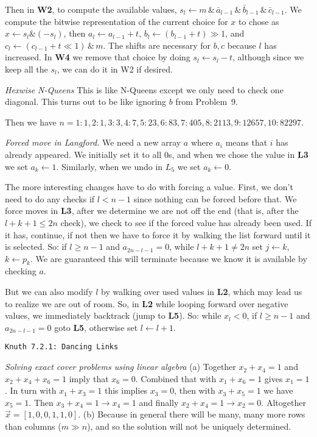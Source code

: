 Then in {\bf W2}, to compute the available values,
$s_l \leftarrow m \,\&\, {\bar a_{l-1}} \,\&\, {\bar b_{l-1}} \,\&\, 
{\bar c_{l-1}}$. We compute the bitwise representation of the current choice 
for $x$ to chose as $x \leftarrow s_l \& \left(- s_l\right)$, then 
$a_l \leftarrow a_{l-1} + t$, $b_l \leftarrow \left(b_{l-1} + t\right) \gg 1$, 
and  $c_l \leftarrow \left( {c_{l-1} + t} \ll 1 \right) \,\&\, m$.  The shifts 
are necessary for $b, c$ because $l$ has increased.  In {\bf W4} we
remove that choice by doing $s_l \leftarrow s_l - t$, although since we keep
all the $s_l$, we can do it in W2 if desired.

 {\it Hexwise N-Queens}\hfil\break
This is like N-Queens except we only need to check one diagonal.  This turns out
to be like ignoring $b$ from Problem~9.

Then we have $n=1: 1, 2: 1, 3: 3, 4: 7, 5: 23, 6: 83, 7: 405, 8: 2113, 9: 12657,
10: 82297$.

 {\it Forced move in Langford.}\hfil\break
We need a new array $a$ where $a_i$ means that $i$ has already appeared.
We initially set it to all 0s, and when we chose the value in {\bf L3}
we set $a_k \leftarrow 1$.  Similarly, when we undo in $L_5$ we set
$a_k \leftarrow 0$.

The more interesting changes have to do with forcing a value.  First,
we don't need to do any checks if $l < n - 1$ since nothing can be forced
before that.  We force moves in {\bf L3}, after we determine we are not
off the end (that is, after the $l + k + 1 \le 2 n$ check), we check to see 
if the forced value has already been used.  If it has, continue, if not
then we have to force it by walking the list forward until it is selected.
So: if $l \ge n - 1$ and $a_{2n - l - 1} = 0$, while $l + k + 1 \ne 2 n$
set $j \leftarrow k$, $k \leftarrow p_k$.  We are guaranteed this will
terminate because we know it is available by checking $a$.

But we can also modify $l$ by walking over used values in {\bf L2}, which
may lead us to realize we are out of room.  So, in {\bf L2} while looping
forward over negative values, we immediately backtrack (jump to {\bf L5}).
So: while $x_l < 0$, if $l \ge n - 1$ and $a_{2 n - l - 1} = 0$ goto {\bf L5},
otherwise set $l \leftarrow l + 1$.


\topglue 0.5in
\centerline{\tt Knuth 7.2.1: Dancing Links}
\vskip 0.3in

 {\it Solving exact cover problems using
linear algebra}\hfil\break
(a) Together $x_2 + x_4 = 1$ and $x_2 + x_4 + x_6 = 1$
imply that $x_6 = 0$.  Combined that with $x_1 + x_6 = 1$
gives $x_1 = 1$.  In turn with $x_1 + x_3 = 1$ this implies
$x_3 = 0$, then with $x_3 + x_5 = 1$ we have $x_5 = 1$.
Then $x_3 + x_4 = 1 \rightarrow x_4 = 1$ and finally
$x_2 + x_4 = 1 \rightarrow x_2 = 0$.  Altogether
$\vec{x} = [1, 0, 0, 1, 1, 0]$.\hfil\break
(b) Because in general there will be many, many more
rows than columns ($m \gg n$), and so the solution
will not be uniquely determined.

